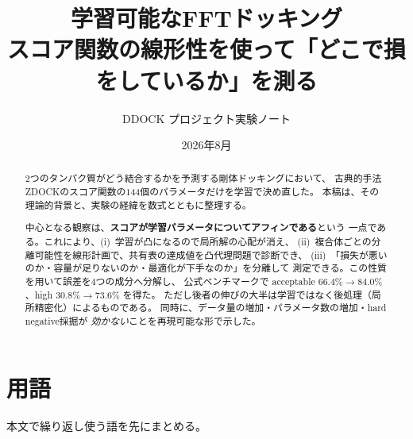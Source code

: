 \documentclass[11pt,a4paper]{article}
\title{学習可能なFFTドッキング\\
{\large スコア関数の線形性を使って「どこで損をしているか」を測る}}
\author{DDOCK プロジェクト実験ノート}
\date{2026年8月}
\begin{document}
\maketitle

\begin{abstract}
2つのタンパク質がどう結合するかを予測する剛体ドッキングにおいて、
古典的手法ZDOCKのスコア関数の$144$個のパラメータだけを学習で決め直した。
本稿は、その理論的背景と、実験の経緯を数式とともに整理する。

中心となる観察は、\textbf{スコアが学習パラメータについてアフィンである}という
一点である。これにより、(i)~学習が凸になるので局所解の心配が消え、
(ii)~複合体ごとの分離可能性を線形計画で、共有表の達成値を凸代理問題で診断でき、
(iii)~「損失が悪いのか・容量が足りないのか・最適化が下手なのか」を分離して
測定できる。この性質を用いて誤差を4つの成分へ分解し、
公式ベンチマークで acceptable $66.4\% \to 84.0\%$、high $30.8\% \to 73.6\%$ を得た。
ただし後者の伸びの大半は学習ではなく後処理（局所精密化）によるものである。
同時に、データ量の増加・パラメータ数の増加・hard negative採掘が
\emph{効かない}ことを再現可能な形で示した。
\end{abstract}

\tableofcontents

\section*{用語}

本文で繰り返し使う語を先にまとめる。
\end{document}
